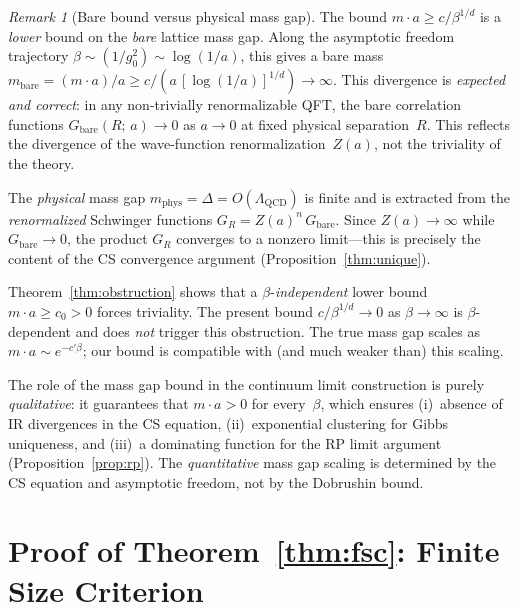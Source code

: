 \documentclass[11pt,a4paper]{article}
\theoremstyle{plain}
\theoremstyle{definition}
\theoremstyle{remark}
\newtheorem{remark}[theorem]{Remark}
\begin{document}
\begin{remark}[Bare bound versus physical mass gap]
\label{rem:bare_vs_phys}
The bound $m \cdot a \geq c/\beta^{1/d}$ is a \emph{lower}
bound on the \emph{bare} lattice mass gap.
Along the asymptotic freedom trajectory
$\beta \sim (1/g_0^2) \sim \log(1/a)$, this gives a bare
mass $m_{\mathrm{bare}} = (m \cdot a)/a
\geq c/(a\,[\log(1/a)]^{1/d}) \to \infty$.
This divergence is \emph{expected and correct}: in any
non-trivially renormalizable QFT, the bare correlation
functions $G_{\mathrm{bare}}(R;\,a) \to 0$ as $a \to 0$
at fixed physical separation~$R$.  This reflects the
divergence of the wave-function renormalization~$Z(a)$,
not the triviality of the theory.

The \emph{physical} mass gap
$m_{\mathrm{phys}} = \Delta = O(\Lambda_{\mathrm{QCD}})$
is finite and is extracted from the \emph{renormalized}
Schwinger functions
$G_R = Z(a)^n\,G_{\mathrm{bare}}$.
Since $Z(a) \to \infty$ while
$G_{\mathrm{bare}} \to 0$, the product $G_R$ converges
to a nonzero limit---this is precisely the content of the
CS convergence argument (Proposition~\ref{thm:unique}).

Theorem~\ref{thm:obstruction} shows that a
$\beta$-\emph{independent} lower bound
$m \cdot a \geq c_0 > 0$ forces triviality.
The present bound $c/\beta^{1/d} \to 0$ as
$\beta \to \infty$ is $\beta$-dependent and does
\emph{not} trigger this obstruction.  The true mass gap
scales as $m \cdot a \sim e^{-c'\beta}$; our bound
is compatible with (and much weaker than) this scaling.

The role of the mass gap bound in the continuum limit
construction is purely \emph{qualitative}: it
guarantees that $m \cdot a > 0$ for every~$\beta$,
which ensures (i)~absence of IR divergences in the
CS equation, (ii)~exponential clustering for Gibbs
uniqueness, and (iii)~a dominating function for the
RP limit argument (Proposition~\ref{prop:rp}).
The \emph{quantitative} mass gap scaling is determined
by the CS equation and asymptotic freedom, not by the
Dobrushin bound.
\end{remark}


\section{Proof of Theorem~\ref{thm:fsc}:
Finite Size Criterion}\label{sec:fsc}
\end{document}
